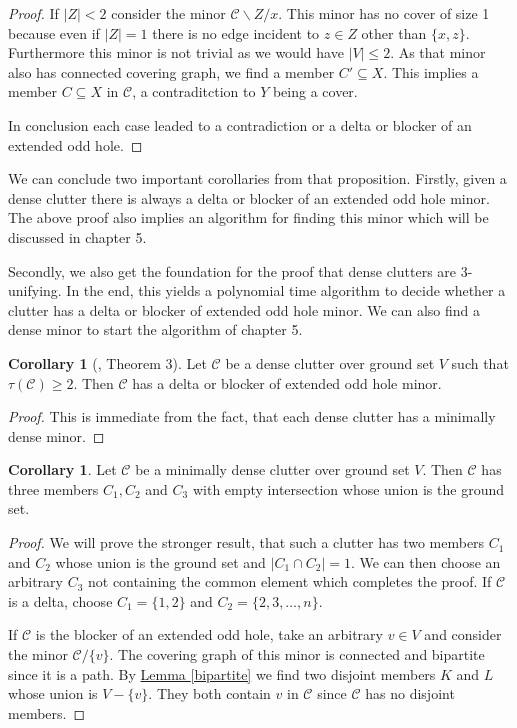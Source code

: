 \documentclass[a4paper, 12pt]{scrbook}
\theoremstyle{definition}
\newtheorem{corollary}[theorem]{Corollary}
\begin{document}
\begin{proof}
       If $|Z|<2$ consider the minor $\mathcal{C}\backslash Z /x$. This minor has no cover of size 1 because even if $|Z|=1$ there is no edge incident to $z \in Z$ other than $\{x,z\}$. Furthermore this minor is not trivial as we would have $|V|\leq 2$.
       As that minor also has connected covering graph, we find a member $C' \subseteq X$. This implies a member $C \subseteq X$ in $\mathcal{C}$, a contraditction to $Y$ being a cover.

       In conclusion each case leaded to a contradiction or a delta or blocker of an extended odd hole.

   \end{proof}

   We can conclude two important corollaries from that proposition. Firstly, given a dense clutter there is always a delta or blocker of an extended odd hole minor. The above proof also implies an algorithm for finding this minor which will be discussed in chapter 5.

   Secondly, we also get the foundation for the proof that dense clutters are 3-unifying. In the end, this yields a polynomial time algorithm to decide whether a clutter has a delta or blocker of extended odd hole minor. We can also find a dense minor to start the algorithm of chapter 5.

   \begin{corollary}[\cite{deltas}, Theorem 3]\label{findminor}
       Let $\mathcal{C}$ be a dense clutter over ground set $V$ such that $\tau(\mathcal{C}) \geq 2$.
       Then $\mathcal{C}$ has a delta or blocker of extended odd hole minor.
   \end{corollary}

   \begin{proof}
       This is immediate from the fact, that each dense clutter has a minimally dense minor.
   \end{proof}

   \begin{corollary}\label{threemember}
       Let $\mathcal{C}$ be a minimally dense clutter over ground set $V$.
       Then $\mathcal{C}$ has three members $C_1, C_2$ and $C_3$ with empty intersection whose union is the ground set.
   \end{corollary}

   \begin{proof}
       We will prove the stronger result, that such a clutter has two members $C_1$ and $C_2$ whose union is the ground set and $|C_1 \cap C_2|=1$.
       We can then choose an arbitrary $C_3$ not containing the common element which completes the proof.
       If $\mathcal{C}$ is a delta, choose $C_1=\{1,2\}$ and $C_2=\{2,3,\ldots,n\}$.

       If $\mathcal{C}$ is the blocker of an extended odd hole, take an arbitrary $v \in V$ and consider the minor $\mathcal{C} / \{v\}$.
       The covering graph of this minor is connected and bipartite since it is a path.
       By \hyperref[bipartite]{Lemma \ref*{bipartite}} we find two disjoint members $K$ and $L$ whose union is $V-\{v\}$.
       They both contain $v$ in $\mathcal{C}$ since $\mathcal{C}$ has no disjoint members.
   \end{proof}
\end{document}
